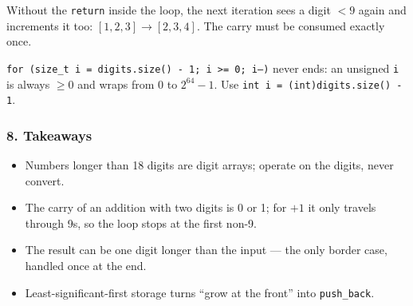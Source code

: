 \begin{warningbox}
Without the \texttt{return} inside the loop, the next iteration sees a digit $< 9$ again and increments it too: $[1,2,3] \to [2,3,4]$. The carry must be consumed exactly once.
\end{warningbox}

\begin{warningbox}
\texttt{for (size\_t i = digits.size() - 1; i >= 0; i--)} never ends: an unsigned \texttt{i} is always $\ge 0$ and wraps from 0 to $2^{64}-1$. Use \texttt{int i = (int)digits.size() - 1}.
\end{warningbox}

\subsubsection*{8. Takeaways}

\begin{itemize}[leftmargin=*]
    \item Numbers longer than 18 digits are digit arrays; operate on the digits, never convert.
    \item The carry of an addition with two digits is 0 or 1; for $+1$ it only travels through 9s, so the loop stops at the first non-9.
    \item The result can be one digit longer than the input --- the only border case, handled once at the end.
    \item Least-significant-first storage turns ``grow at the front'' into \texttt{push\_back}.
\end{itemize}

